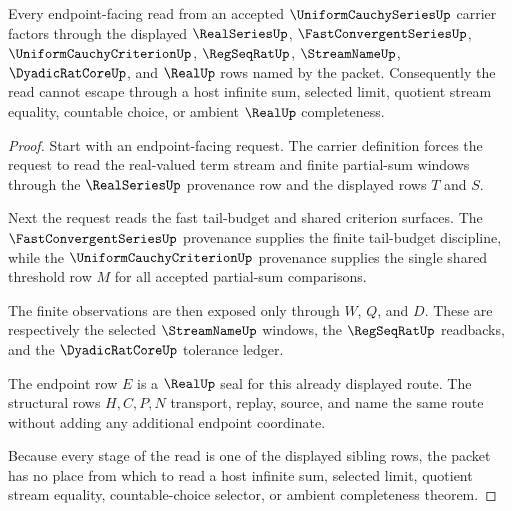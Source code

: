 \begin{theorem}\label{thm:uniform-cauchy-series-tail-threshold-nonescape}
Every endpoint-facing read from an accepted $\UniformCauchySeriesUp$ carrier factors through the displayed $\RealSeriesUp$, $\FastConvergentSeriesUp$, $\UniformCauchyCriterionUp$, $\RegSeqRatUp$, $\StreamNameUp$, $\DyadicRatCoreUp$, and $\RealUp$ rows named by the packet. Consequently the read cannot escape through a host infinite sum, selected limit, quotient stream equality, countable choice, or ambient $\RealUp$ completeness.
\end{theorem}
\begin{proof}
Start with an endpoint-facing request. The carrier definition forces the request to read the real-valued term stream and finite partial-sum windows through the $\RealSeriesUp$ provenance row and the displayed rows $T$ and $S$.

Next the request reads the fast tail-budget and shared criterion surfaces. The $\FastConvergentSeriesUp$ provenance supplies the finite tail-budget discipline, while the $\UniformCauchyCriterionUp$ provenance supplies the single shared threshold row $M$ for all accepted partial-sum comparisons.

The finite observations are then exposed only through $W$, $Q$, and $D$. These are respectively the selected $\StreamNameUp$ windows, the $\RegSeqRatUp$ readbacks, and the $\DyadicRatCoreUp$ tolerance ledger.

The endpoint row $E$ is a $\RealUp$ seal for this already displayed route. The structural rows $H,C,P,N$ transport, replay, source, and name the same route without adding any additional endpoint coordinate.

Because every stage of the read is one of the displayed sibling rows, the packet has no place from which to read a host infinite sum, selected limit, quotient stream equality, countable-choice selector, or ambient completeness theorem.
\end{proof}

